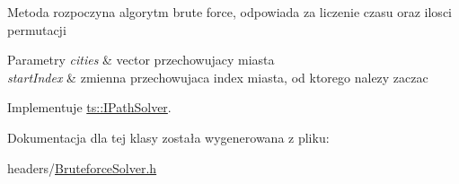 Metoda rozpoczyna algorytm brute force, odpowiada za liczenie czasu oraz ilosci permutacji


\begin{DoxyParams}{Parametry}
{\em cities} & vector przechowujacy miasta \\
\hline
{\em start\+Index} & zmienna przechowujaca index miasta, od ktorego nalezy zaczac \\
\hline
\end{DoxyParams}


Implementuje \mbox{\hyperlink{classts_1_1_i_path_solver_a3d76684ac8ebf47a5edb3af4e0280811}{ts\+::\+I\+Path\+Solver}}.



Dokumentacja dla tej klasy została wygenerowana z pliku\+:\begin{DoxyCompactItemize}
\item 
headers/\mbox{\hyperlink{_bruteforce_solver_8h}{Bruteforce\+Solver.\+h}}\end{DoxyCompactItemize}
